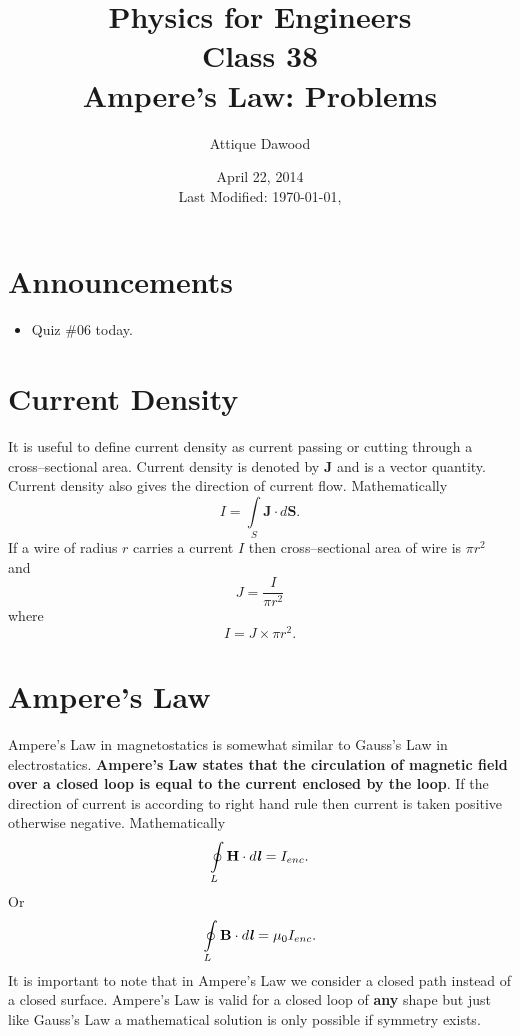 \documentclass[12pt,a4paper]{article}
\title{\vspace{-3cm}Physics for Engineers\\Class 38\\Ampere's Law: Problems}
\author{Attique Dawood}
\date{April 22, 2014\\[0.2cm] Last Modified: \today, \currenttime}
\begin{document}
\maketitle
\section{Announcements}
\begin{itemize}
\item Quiz \#06 today.
\end{itemize}
\section{Current Density}
It is useful to define current density as current passing or cutting through a cross--sectional area. Current density is denoted by \textbf{J} and is a vector quantity. Current density also gives the direction of current flow. Mathematically
\begin{equation}
I=\int\limits_{S}\textbf{J}\cdot d{\textbf{S}}.
\end{equation}
If a wire of radius $r$ carries a current $I$ then cross--sectional area of wire is $\pi r^2$ and
\begin{equation}
J=\dfrac{I}{\pi r^2}
\end{equation}
where
\begin{equation}
I=J\times\pi r^2.
\end{equation}
\section{Ampere's Law}
Ampere's Law in magnetostatics is somewhat similar to Gauss's Law in electrostatics. \textbf{Ampere's Law states that the circulation of magnetic field over a closed loop is equal to the current enclosed by the loop}. If the direction of current is according to right hand rule then current is taken positive otherwise negative. Mathematically
\begin{equation}
\oint\limits_{L}\textbf{H}\cdot d\textbf{\textit{l}}=I_{enc}.
\end{equation}
Or
\begin{equation}
\oint\limits_{L}\textbf{B}\cdot d\textbf{\textit{l}}=\mu_0I_{enc}.
\end{equation}
It is important to note that in Ampere's Law we consider a closed path instead of a closed surface. Ampere's Law is valid for a closed loop of \textbf{any} shape but just like Gauss's Law a mathematical solution is only possible if symmetry exists.
\end{document}
